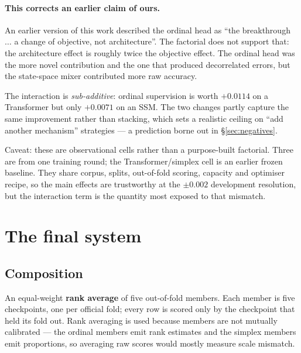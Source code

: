 \documentclass[11pt]{article}
\begin{document}
\paragraph{This corrects an earlier claim of ours.} An earlier version of this work
described the ordinal head as ``the breakthrough $\ldots$ a change of objective, not
architecture''. The factorial does not support that: the architecture effect is roughly
twice the objective effect. The ordinal head was the more novel contribution and the
one that produced decorrelated errors, but the state-space mixer contributed more raw
accuracy.

The interaction is \emph{sub-additive}: ordinal supervision is worth $+0.0114$ on a
Transformer but only $+0.0071$ on an SSM. The two changes partly capture the same
improvement rather than stacking, which sets a realistic ceiling on
``add another mechanism'' strategies --- a prediction borne out in \S\ref{sec:negatives}.

Caveat: these are observational cells rather than a purpose-built factorial. Three are
from one training round; the Transformer/simplex cell is an earlier frozen baseline.
They share corpus, splits, out-of-fold scoring, capacity and optimiser recipe, so the
main effects are trustworthy at the $\pm0.002$ development resolution, but the
interaction term is the quantity most exposed to that mismatch.

\section{The final system}

\subsection{Composition}

An equal-weight \textbf{rank average} of five out-of-fold members. Each member is five
checkpoints, one per official fold; every row is scored only by the checkpoint that
held its fold out. Rank averaging is used because members are not mutually calibrated
--- the ordinal members emit rank estimates and the simplex members emit proportions,
so averaging raw scores would mostly measure scale mismatch.
\end{document}

